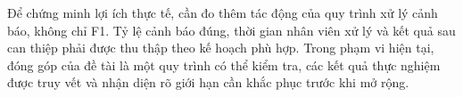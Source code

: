 Để chứng minh lợi ích thực tế, cần đo thêm tác động của quy trình xử lý
cảnh báo, không chỉ F1. Tỷ lệ cảnh báo đúng, thời gian nhân viên xử lý
và kết quả sau can thiệp phải được thu thập theo kế hoạch phù hợp. Trong
phạm vi hiện tại, đóng góp của đề tài là một quy trình có thể kiểm tra,
các kết quả thực nghiệm được truy vết và nhận diện rõ giới hạn cần
khắc phục trước khi mở rộng.
